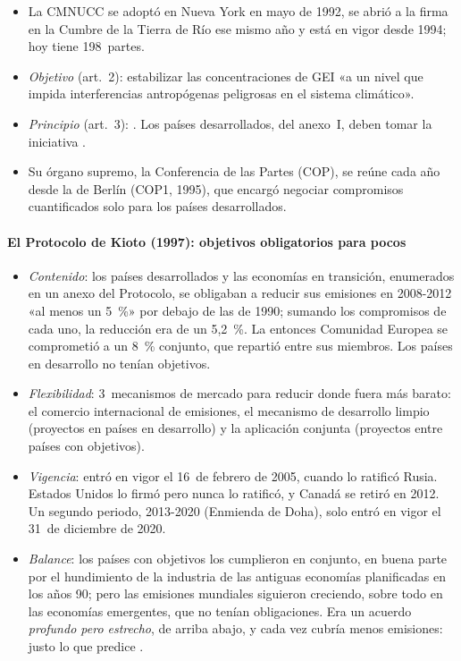 \documentclass[11pt]{article}
\begin{document}
\begin{itemize}
\item La CMNUCC se adoptó en Nueva York en mayo de 1992, se abrió a la firma en la Cumbre de la Tierra de Río ese mismo año y está en vigor desde 1994; hoy tiene 198~partes\nocite{CMNUCC1992Convencion,ONU2026CMNUCC}.
\item \emph{Objetivo} (art.~2): estabilizar las concentraciones de GEI «a un nivel que impida interferencias antropógenas peligrosas en el sistema climático».
\item \emph{Principio} (art.~3): . Los países desarrollados, del anexo~I, deben tomar la iniciativa .
\item Su órgano supremo, la Conferencia de las Partes (COP), se reúne cada año desde la de Berlín (COP1, 1995), que encargó negociar compromisos cuantificados solo para los países desarrollados.
\end{itemize}

\paragraph{El Protocolo de Kioto (1997): objetivos obligatorios para pocos}

\begin{itemize}
\item \emph{Contenido}: los países desarrollados y las economías en transición, enumerados en un anexo del Protocolo, se obligaban a reducir sus emisiones en 2008-2012 «al menos un 5~\%» por debajo de las de 1990; sumando los compromisos de cada uno, la reducción era de un 5,2~\%. La entonces Comunidad Europea se comprometió a un 8~\% conjunto, que repartió entre sus miembros. Los países en desarrollo no tenían objetivos\nocite{ONU1997Kioto}.
\item \emph{Flexibilidad}: 3~mecanismos de mercado para reducir donde fuera más barato: el comercio internacional de emisiones, el mecanismo de desarrollo limpio (proyectos en países en desarrollo) y la aplicación conjunta (proyectos entre países con objetivos).
\item \emph{Vigencia}: entró en vigor el 16~de febrero de 2005, cuando lo ratificó Rusia. Estados Unidos lo firmó pero nunca lo ratificó, y Canadá se retiró en 2012. Un segundo periodo, 2013-2020 (Enmienda de Doha), solo entró en vigor el 31~de diciembre de 2020\nocite{ONU1997Kioto}.
\item \emph{Balance}: los países con objetivos los cumplieron en conjunto, en buena parte por el hundimiento de la industria de las antiguas economías planificadas en los años 90; pero las emisiones mundiales siguieron creciendo, sobre todo en las economías emergentes, que no tenían obligaciones. Era un acuerdo \emph{profundo pero estrecho}, de arriba abajo, y cada vez cubría menos emisiones: justo lo que predice .
\end{itemize}
\end{document}
